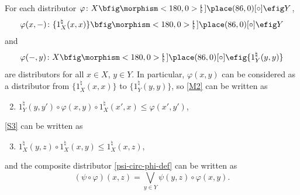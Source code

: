 \documentclass{birkau}
\theoremstyle{plain}
\theoremstyle{definition}
\def\oto{{\bfig\morphism<180,0>[\mkern-4mu`\mkern-4mu;]\place(86,0)[\circ]\efig}}
\newcommand{\bv}{\bigvee}
\newcommand{\nat}{\natural}
\renewcommand{\phi}{\varphi}
\renewcommand{\leq}{\leqslant}
\numberwithin{equation}{section}
\begin{document}
For each distributor $\phi\colon X\oto Y$,
\[\phi(x,-)\colon\{1_X^{\nat}(x,x)\}\oto Y\]
and
\[\phi(-,y)\colon X\oto \{1_Y^{\nat}(y,y)\}\]
are distributors for all $x\in X$, $y\in Y$. In particular, $\phi(x,y)$ can be considered as a distributor from $\{1_X^{\nat}(x,x)\}$ to $\{1_Y^{\nat}(y,y)\}$, so \ref{M2} can be written as
\begin{enumerate}[label=(M\arabic*$^\prime$)]
\setcounter{enumi}{1}
\item \label{M2'} $1_Y^{\nat}(y,y')\circ\phi(x,y)\circ 1_X^{\nat}(x',x)\leq\phi(x',y')$,
\end{enumerate}
\ref{S3} can be written as
\begin{enumerate}[label=(S\arabic*$^\prime$)]
\setcounter{enumi}{2}
\item \label{S3'} $1_X^{\nat}(y,z)\circ 1_X^{\nat}(x,y)\leq 1_X^{\nat}(x,z)$,
\end{enumerate}
and the composite distributor \eqref{psi-circ-phi-def} can be written as
\begin{equation} \label{psi-circ-phi-def'}
(\psi\circ\phi)(x,z)=\bv_{y\in Y}\psi(y,z)\circ\phi(x,y).
\end{equation}
\end{document}
